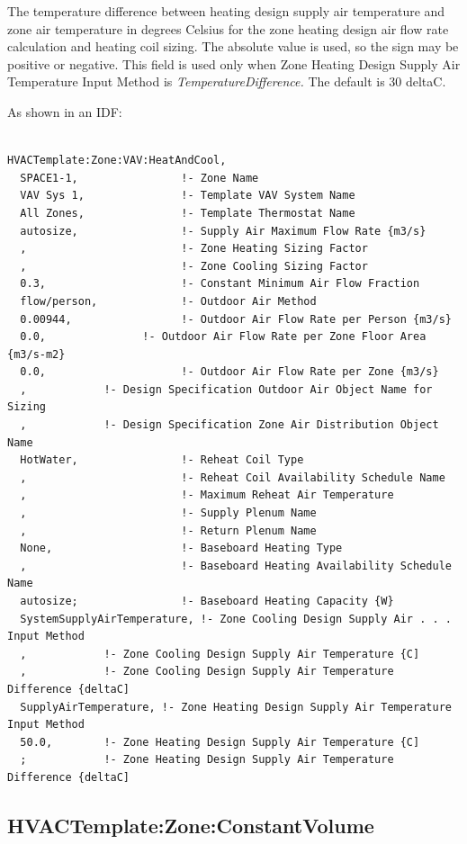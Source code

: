 The temperature difference between heating design supply air temperature and zone air temperature in degrees Celsius for the zone heating design air flow rate calculation and heating coil sizing. The absolute value is used, so the sign may be positive or negative. This field is used only when Zone Heating Design Supply Air Temperature Input Method is \emph{TemperatureDifference.} The default is 30 deltaC.

As shown in an IDF:

\begin{lstlisting}

HVACTemplate:Zone:VAV:HeatAndCool,
  SPACE1-1,                !- Zone Name
  VAV Sys 1,               !- Template VAV System Name
  All Zones,               !- Template Thermostat Name
  autosize,                !- Supply Air Maximum Flow Rate {m3/s}
  ,                        !- Zone Heating Sizing Factor
  ,                        !- Zone Cooling Sizing Factor
  0.3,                     !- Constant Minimum Air Flow Fraction
  flow/person,             !- Outdoor Air Method
  0.00944,                 !- Outdoor Air Flow Rate per Person {m3/s}
  0.0,               !- Outdoor Air Flow Rate per Zone Floor Area {m3/s-m2}
  0.0,                     !- Outdoor Air Flow Rate per Zone {m3/s}
  ,            !- Design Specification Outdoor Air Object Name for Sizing
  ,            !- Design Specification Zone Air Distribution Object Name
  HotWater,                !- Reheat Coil Type
  ,                        !- Reheat Coil Availability Schedule Name
  ,                        !- Maximum Reheat Air Temperature
  ,                        !- Supply Plenum Name
  ,                        !- Return Plenum Name
  None,                    !- Baseboard Heating Type
  ,                        !- Baseboard Heating Availability Schedule Name
  autosize;                !- Baseboard Heating Capacity {W}
  SystemSupplyAirTemperature, !- Zone Cooling Design Supply Air . . . Input Method
  ,            !- Zone Cooling Design Supply Air Temperature {C]
  ,            !- Zone Cooling Design Supply Air Temperature Difference {deltaC]
  SupplyAirTemperature, !- Zone Heating Design Supply Air Temperature Input Method
  50.0,        !- Zone Heating Design Supply Air Temperature {C]
  ;            !- Zone Heating Design Supply Air Temperature Difference {deltaC]
\end{lstlisting}

\subsection{HVACTemplate:Zone:ConstantVolume}\label{hvactemplatezoneconstantvolume}

